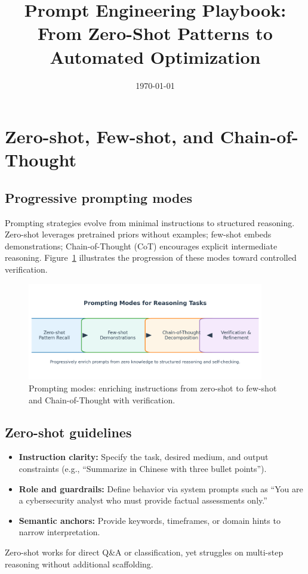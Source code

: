 \documentclass{article}
\title{Prompt Engineering Playbook: From Zero-Shot Patterns to Automated Optimization}
\author{}
\date{\today}
\begin{document}
\maketitle

\section{Zero-shot, Few-shot, and Chain-of-Thought}
\subsection{Progressive prompting modes}
Prompting strategies evolve from minimal instructions to structured reasoning. Zero-shot leverages pretrained priors without examples; few-shot embeds demonstrations; Chain-of-Thought (CoT) encourages explicit intermediate reasoning. Figure~\ref{fig:prompt_modes_en} illustrates the progression of these modes toward controlled verification.
\begin{figure}[H]
  \centering
  \includegraphics[width=0.92\textwidth]{prompt_modes.png}
  \caption{Prompting modes: enriching instructions from zero-shot to few-shot and Chain-of-Thought with verification.}
  \label{fig:prompt_modes_en}
\end{figure}

\subsection{Zero-shot guidelines}
\begin{itemize}
  \item \textbf{Instruction clarity:} Specify the task, desired medium, and output constraints (e.g., “Summarize in Chinese with three bullet points”).
  \item \textbf{Role and guardrails:} Define behavior via system prompts such as “You are a cybersecurity analyst who must provide factual assessments only.”
  \item \textbf{Semantic anchors:} Provide keywords, timeframes, or domain hints to narrow interpretation.
\end{itemize}
Zero-shot works for direct Q\&A or classification, yet struggles on multi-step reasoning without additional scaffolding.
\end{document}
